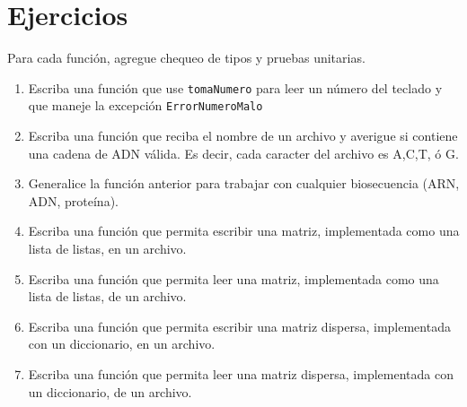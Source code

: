 \section{Ejercicios}

Para cada función, agregue chequeo de tipos y pruebas unitarias.

\begin{enumerate}
 
 \item Escriba una función que use \texttt{tomaNumero} para leer un número del teclado y que 
 maneje la excepción \texttt{ErrorNumeroMalo}

 \item Escriba una función que reciba el nombre de un archivo y averigue si contiene una cadena
 de ADN válida. Es decir, cada caracter del archivo es A,C,T, ó G.
 
 \item Generalice la función anterior para trabajar con cualquier biosecuencia (ARN, ADN, proteína).
 
 \item Escriba una función que permita escribir una matriz, implementada como una lista de listas,
 en un archivo.
 
 \item Escriba una función que permita leer una matriz, implementada como una lista de listas,
 de un archivo.
 
 \item Escriba una función que permita escribir una matriz dispersa, implementada con un diccionario,
 en un archivo.
 
 \item Escriba una función que permita leer una matriz dispersa, implementada con un diccionario,
 de un archivo.
 
\end{enumerate}


